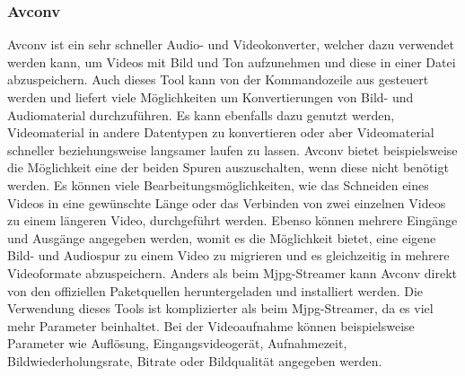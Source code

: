 \subsubsection{Avconv}
Avconv ist ein sehr schneller Audio- und Videokonverter, welcher dazu verwendet werden kann, um Videos mit Bild und Ton aufzunehmen und diese in einer Datei abzuspeichern. Auch dieses Tool kann von der Kommandozeile aus gesteuert werden und liefert viele Möglichkeiten um Konvertierungen von Bild- und Audiomaterial durchzuführen. Es kann ebenfalls dazu genutzt werden, Videomaterial in andere Datentypen zu konvertieren oder aber Videomaterial schneller beziehungsweise langsamer laufen zu lassen. Avconv bietet beispielsweise die Möglichkeit eine der beiden Spuren auszuschalten, wenn diese nicht benötigt werden. Es können viele Bearbeitungsmöglichkeiten, wie das Schneiden eines Videos in eine gewünschte Länge oder das Verbinden von zwei einzelnen Videos zu einem längeren Video, durchgeführt werden. Ebenso können mehrere Eingänge und Ausgänge angegeben werden, womit es die Möglichkeit bietet, eine eigene Bild- und Audiospur zu einem Video zu migrieren und es gleichzeitig in mehrere Videoformate abzuspeichern. Anders als beim Mjpg-Streamer kann Avconv direkt von den offiziellen Paketquellen heruntergeladen und installiert werden. Die Verwendung dieses Tools ist komplizierter als beim Mjpg-Streamer, da es viel mehr Parameter beinhaltet. Bei der Videoaufnahme können beispielsweise Parameter wie Auflösung, Eingangsvideogerät, Aufnahmezeit, Bildwiederholungsrate, Bitrate oder Bildqualität angegeben werden. \cite{Avconv}

